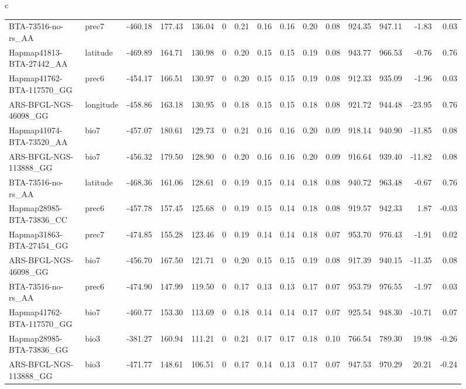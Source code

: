 \documentclass[a4paper,11pt]{article}
\begin{document}
\begin{figure}[htbp]
\begin{turn}{90}
\begin{tabular}{c}
{\begin{tabular}{ll*{13}{r}}
BTA-73516-no-rs\_AA	&	prec7	&	-460.18	&	177.43	&	136.04	&	0	&	0.21	&	0.16	&	0.16	&	0.20	&	0.08	&	924.35	&	947.11	&	-1.83	&	0.03	\\
Hapmap41813-BTA-27442\_AA	&	latitude	&	-469.89	&	164.71	&	130.98	&	0	&	0.20	&	0.15	&	0.15	&	0.19	&	0.08	&	943.77	&	966.53	&	-0.76	&	0.76	\\
Hapmap41762-BTA-117570\_GG	&	prec6	&	-454.17	&	166.51	&	130.97	&	0	&	0.20	&	0.15	&	0.15	&	0.19	&	0.08	&	912.33	&	935.09	&	-1.96	&	0.03	\\
ARS-BFGL-NGS-46098\_GG	&	longitude	&	-458.86	&	163.18	&	130.95	&	0	&	0.18	&	0.15	&	0.15	&	0.18	&	0.08	&	921.72	&	944.48	&	-23.95	&	0.76	\\
Hapmap41074-BTA-73520\_AA	&	bio7	&	-457.07	&	180.61	&	129.73	&	0	&	0.21	&	0.16	&	0.16	&	0.20	&	0.09	&	918.14	&	940.90	&	-11.85	&	0.08	\\
ARS-BFGL-NGS-113888\_GG	&	bio7	&	-456.32	&	179.50	&	128.90	&	0	&	0.20	&	0.16	&	0.16	&	0.20	&	0.09	&	916.64	&	939.40	&	-11.82	&	0.08	\\
BTA-73516-no-rs\_AA	&	latitude	&	-468.36	&	161.06	&	128.61	&	0	&	0.19	&	0.15	&	0.14	&	0.18	&	0.08	&	940.72	&	963.48	&	-0.67	&	0.76	\\
Hapmap28985-BTA-73836\_CC	&	prec6	&	-457.78	&	157.45	&	125.68	&	0	&	0.19	&	0.15	&	0.14	&	0.18	&	0.08	&	919.57	&	942.33	&	1.87	&	-0.03	\\
Hapmap31863-BTA-27454\_GG	&	prec7	&	-474.85	&	155.28	&	123.46	&	0	&	0.19	&	0.14	&	0.14	&	0.18	&	0.07	&	953.70	&	976.43	&	-1.91	&	0.02	\\
ARS-BFGL-NGS-46098\_GG	&	bio7	&	-456.70	&	167.50	&	121.71	&	0	&	0.20	&	0.15	&	0.15	&	0.19	&	0.08	&	917.39	&	940.15	&	-11.35	&	0.08	\\
BTA-73516-no-rs\_AA	&	prec6	&	-474.90	&	147.99	&	119.50	&	0	&	0.17	&	0.13	&	0.13	&	0.17	&	0.07	&	953.79	&	976.55	&	-1.97	&	0.03	\\
Hapmap41762-BTA-117570\_GG	&	bio7	&	-460.77	&	153.30	&	113.69	&	0	&	0.18	&	0.14	&	0.14	&	0.17	&	0.07	&	925.54	&	948.30	&	-10.71	&	0.07	\\
Hapmap28985-BTA-73836\_GG	&	bio3	&	-381.27	&	160.94	&	111.21	&	0	&	0.21	&	0.17	&	0.17	&	0.18	&	0.10	&	766.54	&	789.30	&	19.98	&	-0.26	\\
ARS-BFGL-NGS-113888\_GG	&	bio3	&	-471.77	&	148.61	&	106.51	&	0	&	0.17	&	0.14	&	0.13	&	0.17	&	0.07	&	947.53	&	970.29	&	20.21	&	-0.24	\\
	\end{tabular}
}\\

\end{tabular}
\end{turn}
\end{figure}
\end{document}
